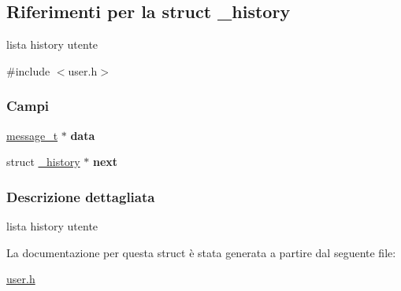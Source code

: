 \hypertarget{struct__history}{}\subsection{Riferimenti per la struct \+\_\+history}
\label{struct__history}


lista history utente  




{\ttfamily \#include $<$user.\+h$>$}

\subsubsection*{Campi}
\begin{DoxyCompactItemize}
\item 
\mbox{\label{struct__history_a16199efa4b60f6418d7f061424a244d7}} 
\mbox{\hyperlink{structmessage__t}{message\+\_\+t}} $\ast$ {\bfseries data}
\item 
\mbox{\label{struct__history_a5ab7eb9b1fcadac259894a87111118f5}} 
struct \mbox{\hyperlink{struct__history}{\+\_\+history}} $\ast$ {\bfseries next}
\end{DoxyCompactItemize}


\subsubsection{Descrizione dettagliata}
lista history utente 

La documentazione per questa struct è stata generata a partire dal seguente file\+:\begin{DoxyCompactItemize}
\item 
\mbox{\hyperlink{user_8h}{user.\+h}}\end{DoxyCompactItemize}
